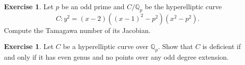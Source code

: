 \documentclass[12pt]{amsart}
\numberwithin{equation}{section}
\theoremstyle{remark}
\theoremstyle{definition}
\theoremstyle{definition}
\theoremstyle{definition}
\theoremstyle{definition}
\theoremstyle{definition}
\theoremstyle{definition}
\newtheorem{exercise}[equation]{Exercise}
\theoremstyle{definition}
\begin{document}
\begin{exercise}
Let $p$ be an odd prime and $C/\mathbb{Q}_p$ be the hyperelliptic curve \[C:y^2=(x-2)((x-1)^2-p^2)(x^2-p^2).\] Compute the Tamagawa number of its Jacobian. 
\end{exercise}

\begin{exercise}
Let $C$ be a hyperelliptic curve over $\mathbb{Q}_p$. Show that $C$ is deficient if and only if it has even genus and no points over any odd degree extension. 
\end{exercise}

\newpage




\end{document}
